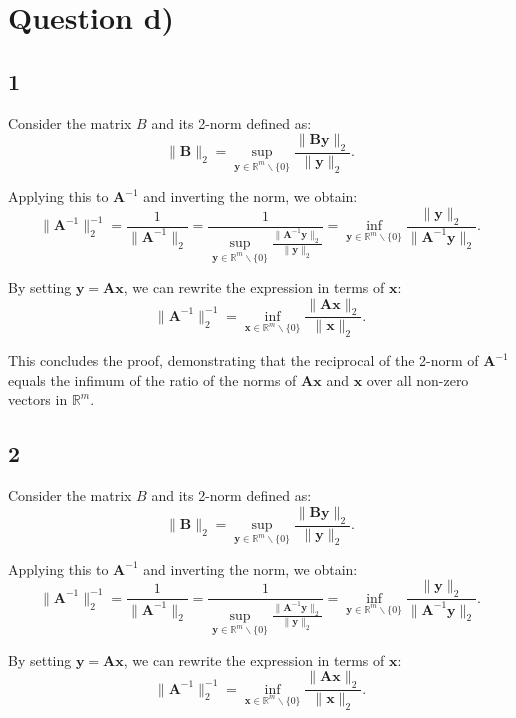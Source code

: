 \documentclass{article}
\begin{document}
\section{Question d)}
\subsection{1}
Consider the matrix $B$ and its 2-norm defined as:
$$
\|\boldsymbol{B}\|_2 = \sup_{\boldsymbol{y} \in \mathbb{R}^m \backslash \{0\}} \frac{\|\boldsymbol{B} \boldsymbol{y}\|_2}{\|\boldsymbol{y}\|_2}.
$$

Applying this to $\boldsymbol{A}^{-1}$ and inverting the norm, we obtain:
$$
\|\boldsymbol{A}^{-1}\|_2^{-1} = \frac{1}{\|\boldsymbol{A}^{-1}\|_2} = \frac{1}{\sup_{\boldsymbol{y} \in \mathbb{R}^m \backslash \{0\}} \frac{\|\boldsymbol{A}^{-1} \boldsymbol{y}\|_2}{\|\boldsymbol{y}\|_2}} = \inf_{\boldsymbol{y} \in \mathbb{R}^m \backslash \{0\}} \frac{\|\boldsymbol{y}\|_2}{\|\boldsymbol{A}^{-1} \boldsymbol{y}\|_2}.
$$

By setting $\boldsymbol{y} = \boldsymbol{A} \boldsymbol{x}$, we can rewrite the expression in terms of $\boldsymbol{x}$:
$$
\|\boldsymbol{A}^{-1}\|_2^{-1} = \inf_{\boldsymbol{x} \in \mathbb{R}^m \backslash \{0\}} \frac{\|\boldsymbol{A} \boldsymbol{x}\|_2}{\|\boldsymbol{x}\|_2}.
$$

This concludes the proof, demonstrating that the reciprocal of the 2-norm of $\boldsymbol{A}^{-1}$ equals the infimum of the ratio of the norms of $\boldsymbol{A} \boldsymbol{x}$ and $\boldsymbol{x}$ over all non-zero vectors in $\mathbb{R}^m$.
\subsection{2}
Consider the matrix $B$ and its 2-norm defined as:
$$
\|\boldsymbol{B}\|_2 = \sup_{\boldsymbol{y} \in \mathbb{R}^m \backslash \{0\}} \frac{\|\boldsymbol{B} \boldsymbol{y}\|_2}{\|\boldsymbol{y}\|_2}.
$$

Applying this to $\boldsymbol{A}^{-1}$ and inverting the norm, we obtain:
$$
\|\boldsymbol{A}^{-1}\|_2^{-1} = \frac{1}{\|\boldsymbol{A}^{-1}\|_2} = \frac{1}{\sup_{\boldsymbol{y} \in \mathbb{R}^m \backslash \{0\}} \frac{\|\boldsymbol{A}^{-1} \boldsymbol{y}\|_2}{\|\boldsymbol{y}\|_2}} = \inf_{\boldsymbol{y} \in \mathbb{R}^m \backslash \{0\}} \frac{\|\boldsymbol{y}\|_2}{\|\boldsymbol{A}^{-1} \boldsymbol{y}\|_2}.
$$

By setting $\boldsymbol{y} = \boldsymbol{A} \boldsymbol{x}$, we can rewrite the expression in terms of $\boldsymbol{x}$:
$$
\|\boldsymbol{A}^{-1}\|_2^{-1} = \inf_{\boldsymbol{x} \in \mathbb{R}^m \backslash \{0\}} \frac{\|\boldsymbol{A} \boldsymbol{x}\|_2}{\|\boldsymbol{x}\|_2}.
$$
\end{document}
